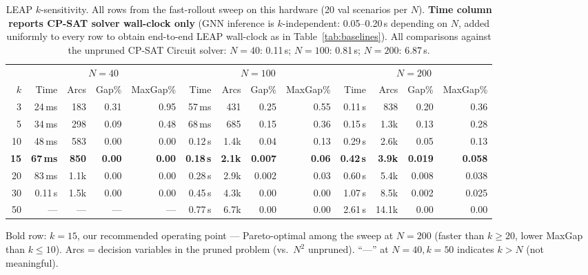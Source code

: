 \documentclass[conference]{IEEEtran}
\begin{document}
\begin{table}[t]
\caption{LEAP $k$-sensitivity. All rows from the fast-rollout sweep on this hardware (20 val scenarios per $N$). \textbf{Time column reports CP-SAT solver wall-clock only} (GNN inference is $k$-independent: 0.05--0.20\,s depending on $N$, added uniformly to every row to obtain end-to-end LEAP wall-clock as in Table~\ref{tab:baselines}). All comparisons against the unpruned CP-SAT Circuit solver: $N{=}40$: 0.11\,s; $N{=}100$: 0.81\,s; $N{=}200$: 6.87\,s.}
\label{tab:k_sens}
\centering
\begin{tabular}{@{}r rrrr rrrr rrrr@{}}
\toprule
& \multicolumn{4}{c}{\textbf{$N{=}40$}} & \multicolumn{4}{c}{\textbf{$N{=}100$}} & \multicolumn{4}{c}{\textbf{$N{=}200$}} \\
\cmidrule(lr){2-5} \cmidrule(lr){6-9} \cmidrule(lr){10-13}
$k$ & Time & Arcs & Gap\% & MaxGap\% & Time & Arcs & Gap\% & MaxGap\% & Time & Arcs & Gap\% & MaxGap\% \\
\midrule
3  & 24\,ms  & 183  & 0.31  & 0.95  & 57\,ms  & 431  & 0.25  & 0.55  & 0.11\,s & 838   & 0.20  & 0.36 \\
5  & 34\,ms  & 298  & 0.09  & 0.48  & 68\,ms  & 685  & 0.15  & 0.36  & 0.15\,s & 1.3k  & 0.13  & 0.28 \\
10 & 48\,ms  & 583  & 0.00  & 0.00  & 0.12\,s & 1.4k & 0.04  & 0.13  & 0.29\,s & 2.6k  & 0.05  & 0.13 \\
\textbf{15} & \textbf{67\,ms} & \textbf{850} & \textbf{0.00} & \textbf{0.00} & \textbf{0.18\,s} & \textbf{2.1k} & \textbf{0.007} & \textbf{0.06} & \textbf{0.42\,s} & \textbf{3.9k} & \textbf{0.019} & \textbf{0.058} \\
20 & 83\,ms  & 1.1k & 0.00  & 0.00  & 0.28\,s & 2.9k & 0.002 & 0.03  & 0.60\,s & 5.4k  & 0.008 & 0.038 \\
30 & 0.11\,s & 1.5k & 0.00  & 0.00  & 0.45\,s & 4.3k & 0.00  & 0.00  & 1.07\,s & 8.5k  & 0.002 & 0.025 \\
50 & ---     & ---  & ---   & ---   & 0.77\,s & 6.7k & 0.00  & 0.00  & 2.61\,s & 14.1k & 0.00  & 0.00 \\
\bottomrule
\end{tabular}

\vspace{2pt}
\raggedright\footnotesize
Bold row: $k{=}15$, our recommended operating point — Pareto-optimal among the sweep at $N{=}200$ (faster than $k\!\ge\!20$, lower MaxGap than $k\!\le\!10$). Arcs = decision variables in the pruned problem (vs.\ $N^2$ unpruned). ``---'' at $N{=}40, k{=}50$ indicates $k{>}N$ (not meaningful).
\end{table}
\end{document}
